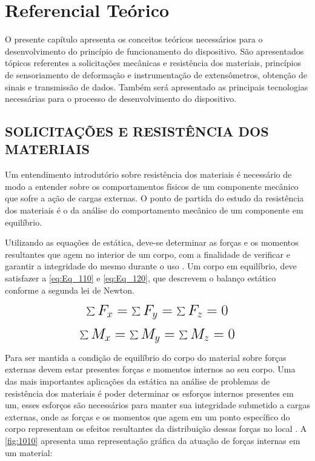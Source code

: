 
\chapter{Referencial Teórico}

O presente capítulo apresenta os conceitos teóricos necessários para o desenvolvimento do princípio de funcionamento do dispositivo.
São apresentados tópicos referentes a solicitações mecânicas e resistência dos materiais, princípios de sensoriamento de deformação e instrumentação de extensômetros,
obtenção de sinais e transmissão de dados. Também será apresentado as principais tecnologias necessárias para o processo de desenvolvimento do dispositivo.

\section{SOLICITAÇÕES E RESISTÊNCIA DOS MATERIAIS}

Um entendimento introdutório sobre resistência dos materiais é necessário de modo a entender sobre os comportamentos físicos de um componente mecânico
que sofre a ação de cargas externas. O ponto de partida do estudo da resistência dos materiais é o da análise do comportamento mecânico de um componente em equilíbrio.

Utilizando as equações de estática, deve-se determinar as forças e os momentos resultantes que agem no interior de um corpo, com a finalidade de verificar
e garantir a integridade do mesmo durante o uso \autocite{Hibbeler2010}. Um corpo em equilíbrio, deve satisfazer a \autoref{eq:Eq_110} e \autoref{eq:Eq_120}, que
descrevem o balanço estático conforme a segunda lei de Newton.

\begin{equation}\label{eq:Eq_110}%
\mbox{\fontsize{17.28}{21.6}\selectfont\( %
\sum F_{x} = \sum F_{y} = \sum F_{z} = 0
\)} %
\end{equation}

\begin{equation}\label{eq:Eq_120}%
\mbox{\fontsize{17.28}{21.6}\selectfont\( %
\sum M_{x} = \sum M_{y} = \sum M_{z} = 0
\)} %
\end{equation}

%
%

\hfill

Para ser mantida a condição de equilíbrio do corpo do material sobre forças externas devem estar presentes forças e momentos internos ao seu corpo.
Uma das mais importantes aplicações da estática na análise de problemas de resistência dos materiais é poder determinar os esforços internos
presentes em um, esses esforços são necessários para manter sua integridade submetido a cargas externas, onde as forças e os momentos que agem em um
ponto específico do corpo representam os efeitos resultantes da distribuição dessas forças no local \autocite{Hibbeler2010}.
A \autoref{fig:1010} apresenta uma representação gráfica da atuação de forças internas em um material:

